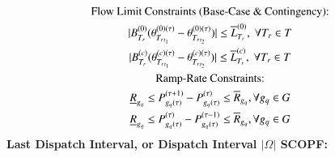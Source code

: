 \documentclass[preprint,12pt,3p]{elsarticle}
\begin{document}
\begin{subequations}
\begin{gather}
\text{Flow Limit Constraints (Base-Case \& Contingency):}\notag\\
|B_{T_r}^{(0)}(\theta_{{T_r}_{t_1}}^{(0)(\tau)}-\theta_{{T_r}_{t_2}}^{(0)(\tau)})|\leq{{\overline{L}}_{T_r}^{(0)}},\;\forall{T_r\in{T}}\label{third_Look-Ahead_General_Second_Interval_Angle}\\
|B_{T_r}^{(c)}(\theta_{{T_r}_{t_1}}^{(c)(\tau)}-\theta_{{T_r}_{t_2}}^{(c)(\tau)})|\leq{{\overline{L}}_{T_r}^{(c)}},\;\forall{T_r\in{T}}\label{third1_Look-Ahead_General_Second_Interval_Angle}\\
\text{Ramp-Rate Constraints:}\notag\\
\underline{R}_{g_q}\leq P_{{g_q}(\tau)}^{(\tau+1)}-P_{{g_q}(\tau)}^{(\tau)}\leq \overline{R}_{g_q},\forall {g_q}\in G\label{fourth_Look-Ahead_General_Second_Interval_Angle}\\
\underline{R}_{g_q}\leq P_{{g_q}(\tau)}^{(\tau)}-P_{{g_q}(\tau)}^{(\tau-1)}\leq \overline{R}_{g_q},\forall {g_q}\in G\label{fifth_Look-Ahead_General_Second_Interval_Angle}
\end{gather}
\end{subequations}
\textbf{Last Dispatch Interval, or Dispatch Interval $|\Omega|$ SCOPF:}
\end{document}

